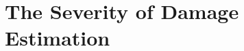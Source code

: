 
\chapter[The Severity of Damage Estimation]{The Severity of Damage Estimation}
\label{ch:severity}



%
%
%
%